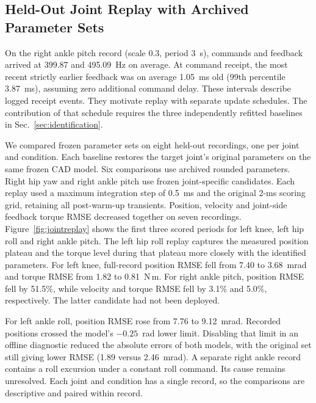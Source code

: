\documentclass[letterpaper,10pt,conference]{ieeeconf}
\begin{document}
\subsection{Held-Out Joint Replay with Archived Parameter Sets}
On the right ankle pitch record (scale 0.3, period 3~s), commands and feedback arrived at 399.87 and 495.09~Hz on average. At command receipt, the most recent strictly earlier feedback was on average 1.05~ms old (99th percentile 3.87~ms), assuming zero additional command delay. These intervals describe logged receipt events. They motivate replay with separate update schedules. The contribution of that schedule requires the three independently refitted baselines in Sec.~\ref{sec:identification}.

We compared frozen parameter sets on eight held-out recordings, one per joint and condition. Each baseline restores the target joint's original parameters on the same frozen CAD model. Six comparisons use archived rounded parameters. Right hip yaw and right ankle pitch use frozen joint-specific candidates. Each replay used a maximum integration step of 0.5~ms and the original 2-ms scoring grid, retaining all post-warm-up transients. Position, velocity and joint-side feedback torque RMSE decreased together on seven recordings. Figure~\ref{fig:jointreplay} shows the first three scored periods for left knee, left hip roll and right ankle pitch. The left hip roll replay captures the measured position plateau and the torque level during that plateau more closely with the identified parameters. For left knee, full-record position RMSE fell from 7.40 to 3.68~mrad and torque RMSE from 1.82 to 0.81~N\,m. For right ankle pitch, position RMSE fell by 51.5\%, while velocity and torque RMSE fell by 3.1\% and 5.0\%, respectively. The latter candidate had not been deployed.

For left ankle roll, position RMSE rose from 7.76 to 9.12~mrad. Recorded positions crossed the model's $-0.25$~rad lower limit. Disabling that limit in an offline diagnostic reduced the absolute errors of both models, with the original set still giving lower RMSE (1.89 versus 2.46~mrad). A separate right ankle record contains a roll excursion under a constant roll command. Its cause remains unresolved. Each joint and condition has a single record, so the comparisons are descriptive and paired within record.
\end{document}
